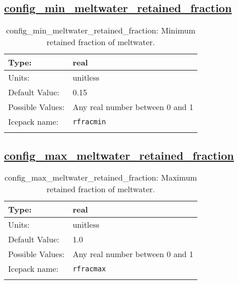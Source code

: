 \subsection[config\_min\_meltwater\_retained\_fraction]{\hyperref[sec:nm_tab_meltponds]{config\_min\_meltwater\_retained\_fraction}}
\label{subsec:nm_sec_config_min_meltwater_retained_fraction}
\begin{center}
\begin{longtable}{| p{2.0in} || p{4.0in} |}
    \hline
    Type: & real \\
    \hline
    Units: & \si{unitless} \\
    \hline
    Default Value: & 0.15 \\
    \hline
    Possible Values: & Any real number between 0 and 1 \\
    \hline
    Icepack name: & \verb+rfracmin+ \\
    \hline
    \caption{config\_min\_meltwater\_retained\_fraction: Minimum retained fraction of meltwater.}
\end{longtable}
\end{center}
\subsection[config\_max\_meltwater\_retained\_fraction]{\hyperref[sec:nm_tab_meltponds]{config\_max\_meltwater\_retained\_fraction}}
\label{subsec:nm_sec_config_max_meltwater_retained_fraction}
\begin{center}
\begin{longtable}{| p{2.0in} || p{4.0in} |}
    \hline
    Type: & real \\
    \hline
    Units: & \si{unitless} \\
    \hline
    Default Value: & 1.0 \\
    \hline
    Possible Values: & Any real number between 0 and 1 \\
    \hline
    Icepack name: & \verb+rfracmax+ \\
    \hline
    \caption{config\_max\_meltwater\_retained\_fraction: Maximum retained fraction of meltwater.}
\end{longtable}
\end{center}
